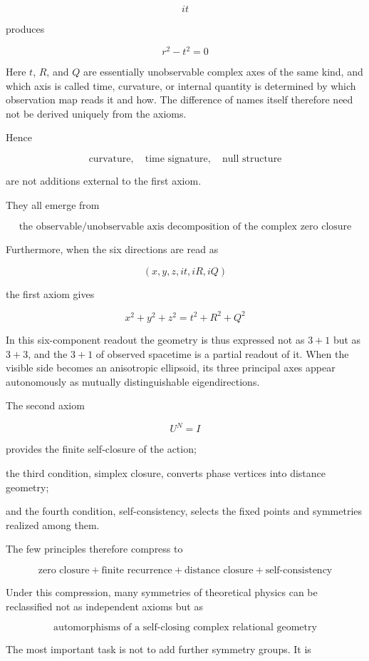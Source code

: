 \documentclass[
  a4paper,
]{article}
\begin{document}
\[
it
\]

produces

\[
r^2-t^2=0
\]

Here \(t\), \(R\), and \(Q\) are essentially unobservable complex axes
of the same kind, and which axis is called time, curvature, or internal
quantity is determined by which observation map reads it and how. The
difference of names itself therefore need not be derived uniquely from
the axioms.

Hence

\[
\boxed{
\text{curvature}
,\quad
\text{time signature}
,\quad
\text{null structure}
}
\]

are not additions external to the first axiom.

They all emerge from

\[
\boxed{
\text{the observable/unobservable axis decomposition of the complex zero closure}
}
\]

Furthermore, when the six directions are read as

\[
(x,y,z,it,iR,iQ)
\]

the first axiom gives

\[
\boxed{
x^2+y^2+z^2=t^2+R^2+Q^2
}
\]

In this six-component readout the geometry is thus expressed not as
\(3+1\) but as \(3+3\), and the \(3+1\) of observed spacetime is a
partial readout of it. When the visible side becomes an anisotropic
ellipsoid, its three principal axes appear autonomously as mutually
distinguishable eigendirections.

The second axiom

\[
U^N=I
\]

provides the finite self-closure of the action;

the third condition, simplex closure, converts phase vertices into
distance geometry;

and the fourth condition, self-consistency, selects the fixed points and
symmetries realized among them.

The few principles therefore compress to

\[
\boxed{
\text{zero closure}
+
\text{finite recurrence}
+
\text{distance closure}
+
\text{self-consistency}
}
\]

Under this compression, many symmetries of theoretical physics can be
reclassified not as independent axioms but as

\[
\boxed{
\text{automorphisms of a self-closing complex relational geometry}
}
\]

The most important task is not to add further symmetry groups. It is
\end{document}
